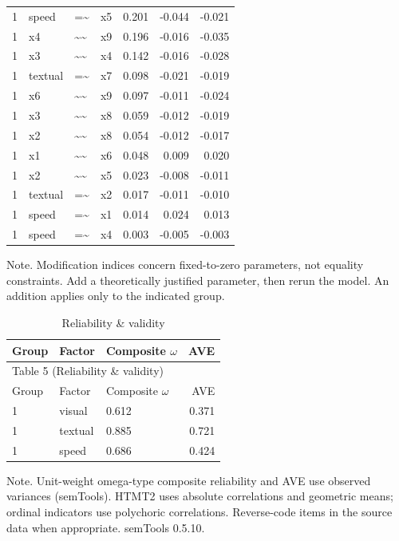 \documentclass[11pt]{article}
\begin{document}
\begin{longtable}{llllrrr}
1 & speed & =\textasciitilde{} & x5 & 0.201 & -0.044 & -0.021 \\
1 & x4 & \textasciitilde{}\textasciitilde{} & x9 & 0.196 & -0.016 & -0.035 \\
1 & x3 & \textasciitilde{}\textasciitilde{} & x4 & 0.142 & -0.016 & -0.028 \\
1 & textual & =\textasciitilde{} & x7 & 0.098 & -0.021 & -0.019 \\
1 & x6 & \textasciitilde{}\textasciitilde{} & x9 & 0.097 & -0.011 & -0.024 \\
1 & x3 & \textasciitilde{}\textasciitilde{} & x8 & 0.059 & -0.012 & -0.019 \\
1 & x2 & \textasciitilde{}\textasciitilde{} & x8 & 0.054 & -0.012 & -0.017 \\
1 & x1 & \textasciitilde{}\textasciitilde{} & x6 & 0.048 & 0.009 & 0.020 \\
1 & x2 & \textasciitilde{}\textasciitilde{} & x5 & 0.023 & -0.008 & -0.011 \\
1 & textual & =\textasciitilde{} & x2 & 0.017 & -0.011 & -0.010 \\
1 & speed & =\textasciitilde{} & x1 & 0.014 & 0.024 & 0.013 \\
1 & speed & =\textasciitilde{} & x4 & 0.003 & -0.005 & -0.003 \\
\bottomrule
\end{longtable}
\noindent Note. Modification indices concern fixed-to-zero parameters, not equality constraints. Add a theoretically justified parameter, then rerun the model. An addition applies only to the indicated group.\par

\small
\begin{longtable}{lllr}
\caption{Reliability \& validity}\\
\toprule
Group & Factor & Composite $\omega$ & AVE \\
\midrule
\endfirsthead
\multicolumn{4}{l}{Table 5 (Reliability \& validity)} \\
\toprule
Group & Factor & Composite $\omega$ & AVE \\
\midrule
\endhead
1 & visual & 0.612 & 0.371 \\
1 & textual & 0.885 & 0.721 \\
1 & speed & 0.686 & 0.424 \\
\bottomrule
\end{longtable}
\noindent Note. Unit-weight omega-type composite reliability and AVE use observed variances (semTools). HTMT2 uses absolute correlations and geometric means; ordinal indicators use polychoric correlations. Reverse-code items in the source data when appropriate. semTools 0.5.10.\par
\end{document}
